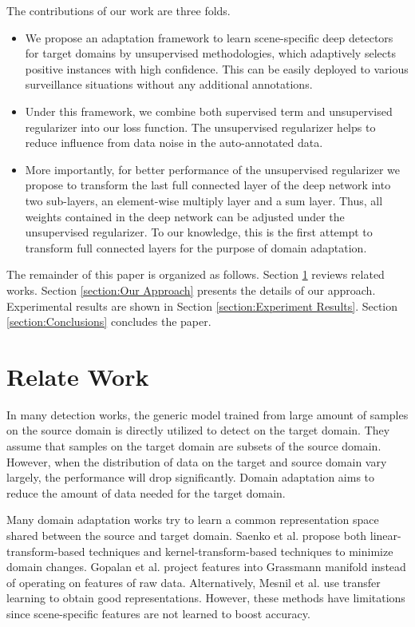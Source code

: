 \documentclass[runningheads]{llncs}
\begin{document}
The contributions of our work are three folds.
\begin{itemize}
\item We propose an adaptation framework to learn scene-specific deep detectors for target domains by unsupervised methodologies, which adaptively selects positive instances with high confidence. This can be easily deployed to various surveillance situations without any additional annotations.
\item Under this framework, we combine both supervised term and unsupervised regularizer into our loss function. The unsupervised regularizer helps to reduce influence from data noise in the auto-annotated data.
\item More importantly, for better performance of the unsupervised regularizer we propose to transform the last full connected layer of the deep network into two sub-layers, an element-wise multiply layer and a sum layer. Thus, all weights contained in the deep network can be adjusted under the unsupervised regularizer. To our knowledge, this is the first attempt to transform full connected layers for the purpose of domain adaptation.
\end{itemize}

The remainder of this paper is organized as follows. Section \ref{section:Relate Work} reviews related works. Section \ref{section:Our Approach} presents the details of our approach. Experimental results are shown in Section \ref{section:Experiment Results}. Section \ref{section:Conclusions} concludes the paper.

\section{Relate Work}
\label{section:Relate Work}

In many detection works, the generic model trained from large amount of samples on the source domain is directly utilized to detect on the target domain. They assume that samples on the target domain are subsets of the source domain. However, when the distribution of data on the target and source domain vary largely, the performance will drop significantly. Domain adaptation aims to reduce the amount of data needed for the target domain.

Many domain adaptation works try to learn a common representation space shared between the source and target domain. Saenko et al. \cite{saenko2010adapting,kulis2011you} propose both linear-transform-based techniques and kernel-transform-based techniques to minimize domain changes. Gopalan et al. \cite{gopalan2011domain} project features into Grassmann manifold instead of operating on features of raw data. Alternatively, Mesnil et al. \cite{mesnil2012unsupervised} use transfer learning to obtain good representations. However, these methods have limitations since scene-specific features are not learned to boost accuracy.
\end{document}
